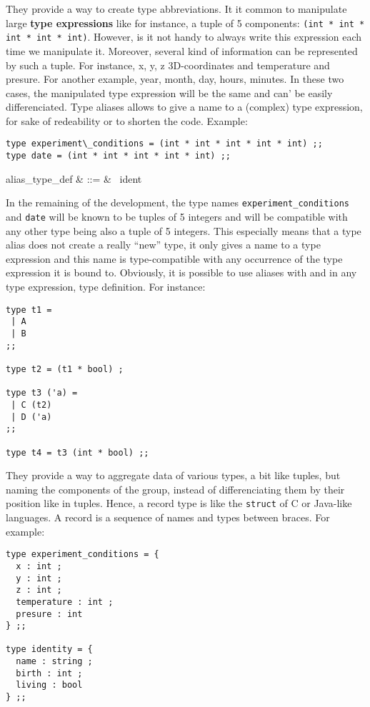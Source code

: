 \vspace{0.5cm}

They provide a way to create type abbreviations. It it common to
manipulate large {\bf type expressions} like for instance, a tuple of
5 components: {\tt (int * int * int * int * int)}. However, is it not
handy to always write this expression each time we manipulate
it. Moreover, several kind of information can be represented by such a
tuple. For instance, x, y, z 3D-coordinates and temperature and
presure. For another example, year, month, day, hours, minutes. In
these two cases, the manipulated type expression will be the same and
can' be easily differenciated. Type aliases allows to give a name to a
(complex) type expression, for sake of redeability or to shorten the
code. Example:
{\scriptsize
\begin{lstlisting}
type experiment\_conditions = (int * int * int * int * int) ;;
type date = (int * int * int * int * int) ;;
\end{lstlisting}
}

\vspace{0.2cm}
\begin{syntax}
alias\_type\_def & ::= & \ ident\ \terminal{=}\ \tau
\end{syntax}
\vspace{0.2cm}

In the remaining of the development, the type names
{\tt  experiment\_conditions} and {\tt date} will be known to be
tuples of 5 integers and will be compatible with any other type being
also a tuple of 5 integers. This especially means that a type alias
does not create a really ``new'' type, it only gives a name to a type
expression and this name is type-compatible with any occurrence of the
type expression it is bound to. Obviously, it is possible to use
aliases with and in any type expression, type definition. For
instance:
{\scriptsize
\begin{lstlisting}
type t1 =
 | A
 | B
;;

type t2 = (t1 * bool) ;

type t3 ('a) =
 | C (t2)
 | D ('a)
;;

type t4 = t3 (int * bool) ;;
\end{lstlisting}
}



\vspace{0.5cm}

They provide a way to aggregate data of various types, a bit like
tuples, but naming the components of the group, instead of
differenciating them by their position like in tuples. Hence, a record
type is like the {\tt struct} of C or Java-like languages. A record is
a sequence of names and types between braces. For example:
{\scriptsize
\begin{lstlisting}
type experiment_conditions = {
  x : int ;
  y : int ;
  z : int ;
  temperature : int ;
  presure : int
} ;;

type identity = {
  name : string ;
  birth : int ;
  living : bool
} ;;
\end{lstlisting}
}

